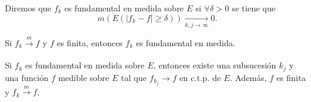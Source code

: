 \begin{definicion}{}
Diremos que $f_k$ es fundamental en medida sobre $E$ si $\forall \delta>0$ se tiene que 
\[
m\left(E\left(\left|f_k-f\right|\geq \delta\right)\right)\xrightarrow[k,j \to \infty]{} 0.
\]
\end{definicion}

\begin{observacion}{}
Si $f_k \xrightarrow[]{m}f$ y $f$ es finita, entonces $f_k$ es fundamental en medida. 
\end{observacion}



\begin{teorema}{}
Si $f_k$ es fundamental en medida sobre $E$, entonces existe una subsucesi\'on $k_j$ y una funci\'on $f$ medible sobre $E$ tal que $f_{k_j}\to f$ en c.t.p. de $E$. Adem\'as, $f$ es finita y $f_{k} \xrightarrow[]{m}f$.
\end{teorema}

